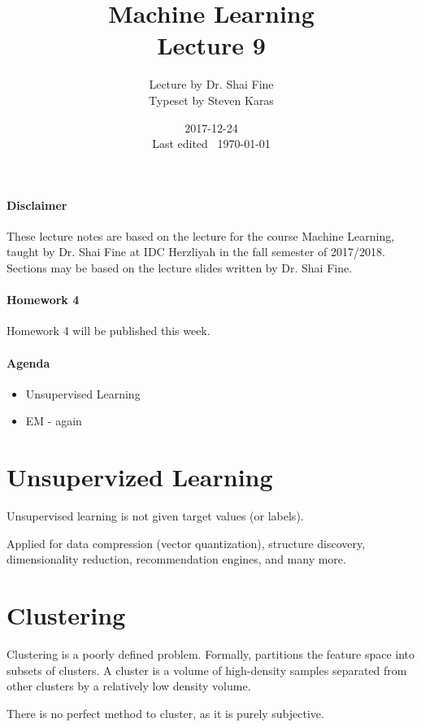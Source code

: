 \documentclass{idc_msc}
\title{Machine Learning\\\large Lecture 9}
\date{2017-12-24 \\ Last edited \currenttime\ \today}
\author{Lecture by Dr. Shai Fine\\Typeset by Steven Karas}
\begin{document}
\maketitle

\paragraph{Disclaimer}

These lecture notes are based on the lecture for the course Machine Learning, taught by Dr. Shai Fine at IDC Herzliyah in the fall semester of 2017/2018.
Sections may be based on the lecture slides written by Dr. Shai Fine.

\paragraph{Homework 4}

Homework 4 will be published this week.

\paragraph{Agenda}

\begin{itemize}
  \item Unsupervised Learning
  \item EM - again
\end{itemize}

\section{Unsupervized Learning}

Unsupervised learning is not given target values (or labels).

Applied for data compression (vector quantization), structure discovery, dimensionality reduction, recommendation engines, and many more.

\section{Clustering}

Clustering is a poorly defined problem.
Formally, partitions the feature space into subsets of clusters. A cluster is a volume of high-density samples separated from other clusters by a relatively low density volume.

There is no perfect method to cluster, as it is purely subjective.
\end{document}

